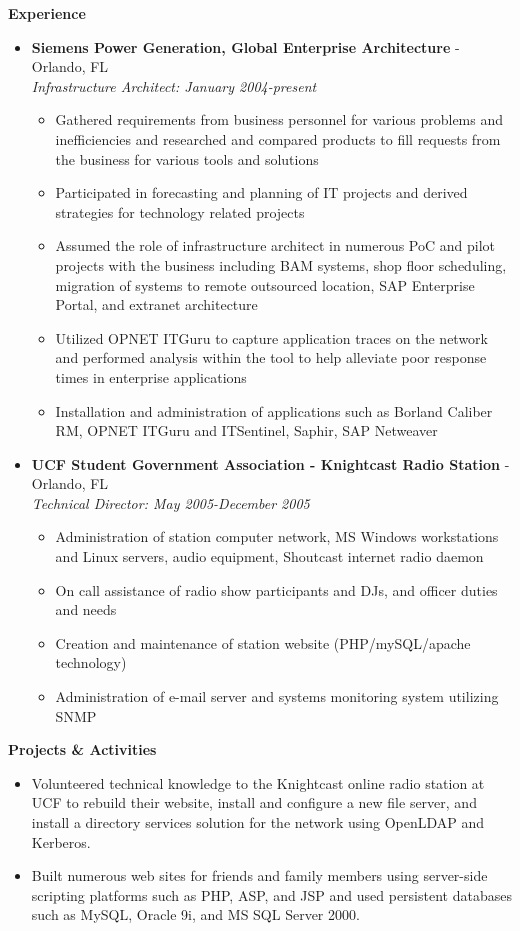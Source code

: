 \documentclass[10pt,oneside]{article}
\newenvironment{ressection}[1]{
	\vspace{4pt}
	\textbf{\selectfont\normalsize#1}
	\begin{itemize}
	\vspace{3pt}
}{
	\end{itemize}
}
\newcommand{\resitem}[1]{
	\vspace{-4pt}
	\item \begin{flushleft} #1 \end{flushleft}
}
\newcommand{\ressubitem}[1]{
	\vspace{-1pt}
	\item \begin{flushleft} #1 \end{flushleft}
}
\newcommand{\resbigitem}[3]{
	\vspace{-5pt}
	\item
	\textbf{#1} - #2 \\
	\textit{#3}
}
\newenvironment{ressubsec}[3]{
	\resbigitem{#1}{#2}{#3}
	\vspace{-2pt}
	\begin{itemize}
}{
	\end{itemize}
}
\begin{document}
\begin{ressection}{Experience}

	\begin{ressubsec}{Siemens Power Generation, Global Enterprise Architecture}{Orlando, FL}{Infrastructure Architect: January 2004-present}
		\ressubitem{Gathered requirements from business personnel for various problems and inefficiencies and researched and compared products to fill requests from the business for various tools and solutions}
		\ressubitem{Participated in forecasting and planning of IT projects and derived strategies for technology related projects}
		\ressubitem{Assumed the role of infrastructure architect in numerous PoC and pilot projects with the business including BAM systems, shop floor scheduling, migration of systems to remote outsourced location, SAP Enterprise Portal, and extranet architecture}
		\ressubitem{Utilized OPNET ITGuru to capture application traces on the network and performed analysis within the tool to help alleviate poor response times in enterprise applications}
		\ressubitem{Installation and administration of applications such as Borland Caliber RM, OPNET ITGuru and ITSentinel, Saphir, SAP Netweaver}
	\end{ressubsec}

	\begin{ressubsec}{UCF Student Government Association - Knightcast Radio Station}{Orlando, FL}{Technical Director: May 2005-December 2005}
		\ressubitem{Administration of station computer network, MS Windows workstations and Linux servers, audio equipment, Shoutcast internet radio daemon}
		\ressubitem{On call assistance of radio show participants and DJs, and officer duties and needs}
		\ressubitem{Creation and maintenance of station website (PHP/mySQL/apache technology)}
		\ressubitem{Administration of e-mail server and systems monitoring system utilizing SNMP}
	\end{ressubsec}

\end{ressection}

\begin{ressection}{Projects \& Activities}

	\resitem{Volunteered technical knowledge to the Knightcast online radio station at UCF to rebuild their website, install and configure a new file server, and install a directory services solution for the network using OpenLDAP and Kerberos.}
	\resitem{Built numerous web sites for friends and family members using server-side scripting platforms such as PHP, ASP, and JSP and used persistent databases such as MySQL, Oracle 9i, and MS SQL Server 2000.}

\end{ressection}
\end{document}
